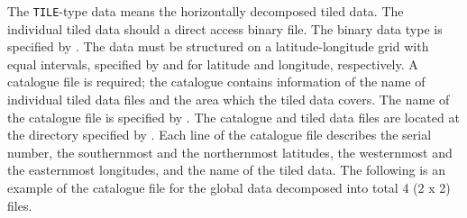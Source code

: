 The \verb|TILE|-type data means the horizontally decomposed tiled data.
The individual tiled data should a direct access binary file.
The binary data type is specified by .
The data must be structured on a latitude-longitude grid with equal intervals, specified by  and  for latitude and longitude, respectively.
A catalogue file is required; the catalogue contains information of the name of individual tiled data files and the area which the tiled data covers.
The name of the catalogue file is specified by .
The catalogue and tiled data files are located at the directory specified by .
Each line of the catalogue file describes the serial number, the southernmost and the northernmost latitudes, the westernmost and the easternmost longitudes, and the name of the tiled data.
The following is an example of the catalogue file for the global data decomposed into total 4 (2 x 2) files.

